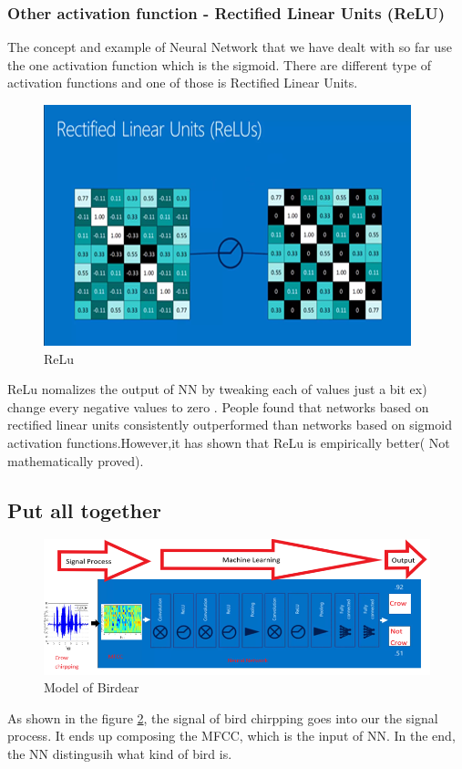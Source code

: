 \documentclass{article}
\begin{document}
\subsubsection{Other activation function - Rectified Linear Units (ReLU)}
The concept and example of Neural Network that we have dealt with so far use the one activation function which is the sigmoid. There are different type of activation functions and one of those is Rectified Linear Units.
\begin{figure}[H]
\includegraphics[scale=0.8]{img/relu.png}
\caption{ReLu \protect\cite{CON}}
\label{rele}
\end{figure}
\hfill \break ReLu nomalizes the output of NN by tweaking each of values just a bit ex) change every negative values to zero \cite{DL}.
People found that networks based on rectified linear units consistently outperformed than networks based on sigmoid activation functions.However,it has shown that ReLu is empirically better( Not mathematically proved).

\subsection{Put all together}

\begin{figure}[H]
\includegraphics[scale=0.7]{img/all.png}
\caption{Model of Birdear}
\label{mod}
\end{figure}
As shown in the figure \ref{mod}, the signal of bird chirpping goes into our the signal process. It ends up composing the MFCC, which is the input of NN. In the end, the NN distingusih what kind of bird is.
\end{document}
